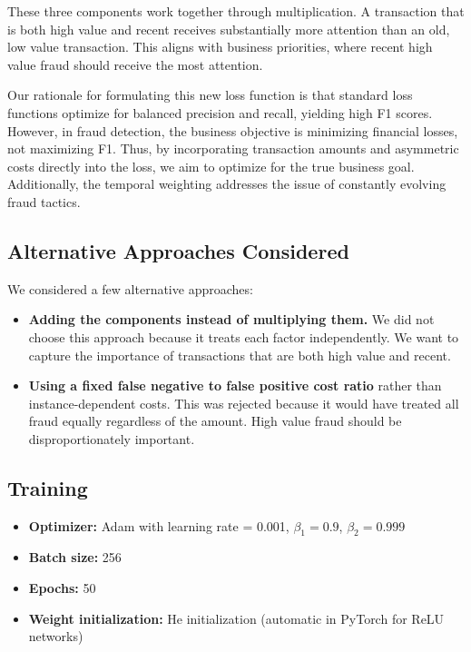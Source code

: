 \documentclass[10pt,twocolumn,letterpaper]{article}
\begin{document}
These three components work together through multiplication. A transaction that is both high value and recent receives substantially more attention than an old, low value transaction. This aligns with business priorities, where recent high value fraud should receive the most attention.

Our rationale for formulating this new loss function is that standard loss functions optimize for balanced precision and recall, yielding high F1 scores. However, in fraud detection, the business objective is minimizing financial losses, not maximizing F1. Thus, by incorporating transaction amounts and asymmetric costs directly into the loss, we aim to optimize for the true business goal. Additionally, the temporal weighting addresses the issue of constantly evolving fraud tactics.

\subsection{Alternative Approaches Considered}

We considered a few alternative approaches:

\begin{itemize}
  \item \textbf{Adding the components instead of multiplying them.} We did not choose this approach because it treats each factor independently. We want to capture the importance of transactions that are both high value and recent.
  
  \item \textbf{Using a fixed false negative to false positive cost ratio} rather than instance-dependent costs. This was rejected because it would have treated all fraud equally regardless of the amount. High value fraud should be disproportionately important.
\end{itemize}

\subsection{Training}

\begin{itemize}
  \item \textbf{Optimizer:} Adam with learning rate = 0.001, $\beta_1 = 0.9$, $\beta_2 = 0.999$
  \item \textbf{Batch size:} 256
  \item \textbf{Epochs:} 50
  \item \textbf{Weight initialization:} He initialization (automatic in PyTorch for ReLU networks)
\end{itemize}
\end{document}
